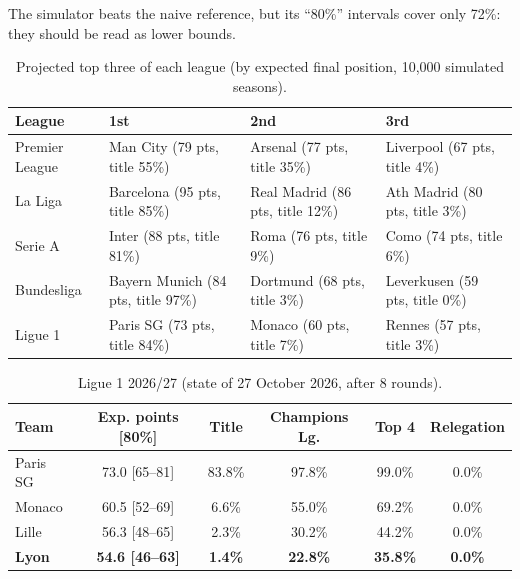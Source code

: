 \documentclass[11pt,a4paper]{article}
\theoremstyle{definition}
\theoremstyle{remark}
\begin{document}
The simulator beats the naive reference, but its ``80\%'' intervals cover only 72\%: they should be read as lower bounds.

\begin{table}[H]
\caption{Projected top three of each league (by expected final position, 10{,}000 simulated seasons).}
\begin{center}
\footnotesize
\begin{tabular}{llll}
\toprule
\textbf{League} & \textbf{1st} & \textbf{2nd} & \textbf{3rd} \\
\midrule
Premier League & Man City (79 pts, title 55\%) & Arsenal (77 pts, title 35\%) & Liverpool (67 pts, title 4\%) \\
La Liga & Barcelona (95 pts, title 85\%) & Real Madrid (86 pts, title 12\%) & Ath Madrid (80 pts, title 3\%) \\
Serie A & Inter (88 pts, title 81\%) & Roma (76 pts, title 9\%) & Como (74 pts, title 6\%) \\
Bundesliga & Bayern Munich (84 pts, title 97\%) & Dortmund (68 pts, title 3\%) & Leverkusen (59 pts, title 0\%) \\
Ligue 1 & Paris SG (73 pts, title 84\%) & Monaco (60 pts, title 7\%) & Rennes (57 pts, title 3\%) \\
\bottomrule
\end{tabular}
\end{center}
\end{table}

\begin{table}[H]
\caption{Ligue 1 2026/27 (state of 27 October 2026, after 8 rounds).}
\begin{center}
\small
\begin{tabular}{lccccc}
\toprule
\textbf{Team} & \textbf{Exp. points [80\%]} & \textbf{Title} & \textbf{Champions Lg.} & \textbf{Top 4} & \textbf{Relegation} \\
\midrule
Paris SG & 73.0 [65--81] & 83.8\% & 97.8\% & 99.0\% & 0.0\% \\
Monaco & 60.5 [52--69] & 6.6\% & 55.0\% & 69.2\% & 0.0\% \\
Lille & 56.3 [48--65] & 2.3\% & 30.2\% & 44.2\% & 0.0\% \\
\textbf{Lyon} & \textbf{54.6 [46--63]} & \textbf{1.4\%} & \textbf{22.8\%} & \textbf{35.8\%} & \textbf{0.0\%} \\
\bottomrule
\end{tabular}
\end{center}
\end{table}
\end{document}
